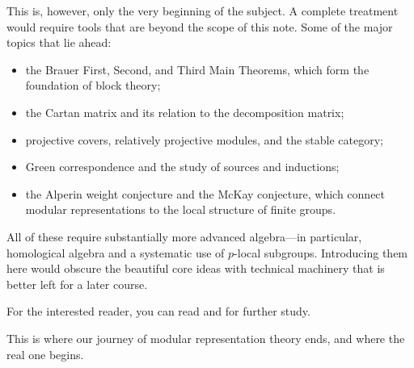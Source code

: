 This is, however, only the very beginning of the subject. A complete 
treatment would require tools that are beyond the scope of this 
note. Some of the major 
topics that lie ahead:

\begin{itemize}
\item the Brauer First, Second, and Third Main Theorems, which form 
the foundation of block theory;
\item the Cartan matrix and its relation to the decomposition matrix;
\item projective covers, relatively projective modules, and the stable 
category;
\item Green correspondence and the study of sources and inductions;
\item the Alperin weight conjecture and the McKay conjecture, which 
connect modular representations to the local structure of finite groups.
\end{itemize}

All of these require substantially more advanced algebra—in particular, 
homological algebra and a systematic use of $p$-local subgroups. 
Introducing them here would obscure the beautiful core ideas with 
technical machinery that is better left for a later course.

For the interested reader, you can read \cite{serre1977linear} and \cite{alperin1977modular} for further study.

This is where our journey of modular representation 
theory ends, and where the real one begins.